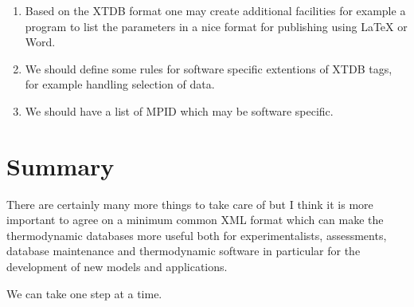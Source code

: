 \documentclass{article}
\begin{document}
\begin{enumerate}
\item Based on the XTDB format one may create additional facilities
  for example a program to list the parameters in a nice format for
  publishing using LaTeX or Word.

\item We should define some rules for software specific extentions of
  XTDB tags, for example handling selection of data.
  
\item We should have a list of MPID which may be software specific.

\end{enumerate}

\section{Summary}

There are certainly many more things to take care of but I think it is
more important to agree on a minimum common XML format which can make
the thermodynamic databases more useful both for experimentalists,
assessments, database maintenance and thermodynamic software in
particular for the development of new models and applications.

We can take one step at a time.

\newpage 
\end{document}
